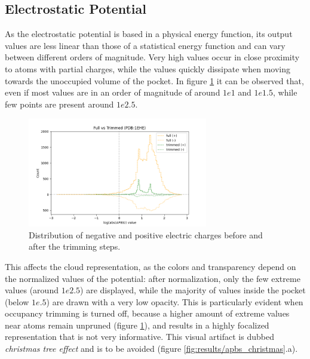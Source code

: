   \subsection{Electrostatic Potential}
    As the electrostatic potential is based in a physical energy function, its output values are less linear than those of a statistical energy function and can vary between different orders of magnitude. Very high values occur in close proximity to atoms with partial charges, while the values quickly dissipate when moving towards the unoccupied volume of the pocket. In figure \ref{fig:results/logapbs_trimming} it can be observed that, even if most values are in an order of magnitude of around $1e1$ and $1e1.5$, while few points are present around $1e2.5$.

    \begin{figure}[H]
      \centering
      \includegraphics[width=0.7\textwidth]{figures/results/logapbs_trimming.png}
      \caption{\label{fig:results/logapbs_trimming} Distribution of negative and positive electric charges before and after the trimming steps.}
    \end{figure}

    This affects the cloud representation, as the colors and transparency depend on the normalized values of the potential: after normalization, only the few extreme values (around $1e2.5$) are displayed, while the majority of values inside the pocket (below $1e.5$) are drawn with a very low opacity. This is particularly evident when occupancy trimming is turned off, because a higher amount of extreme values near atoms remain unpruned (figure \ref{fig:results/logapbs_trimming}), and results in a highly focalized representation that is not very informative. This visual artifact is dubbed \textit{christmas tree effect} and is to be avoided (figure \ref{fig:results/apbs_christmas}.a).

